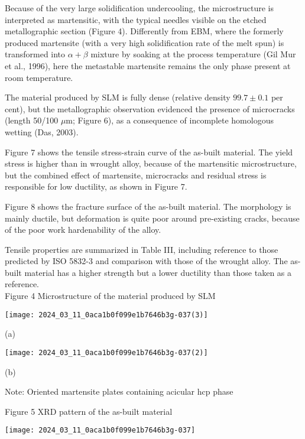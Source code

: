\documentclass[10pt]{article}
\begin{document}
Because of the very large solidification undercooling, the microstructure is interpreted as martensitic, with the typical needles visible on the etched metallographic section (Figure 4). Differently from EBM, where the formerly produced martensite (with a very high solidification rate of the melt spun) is transformed into $\alpha+\beta$ mixture by soaking at the process temperature (Gil Mur et al., 1996), here the metastable martensite remains the only phase present at room temperature.

The material produced by SLM is fully dense (relative density $99.7 \pm 0.1$ per cent), but the metallographic observation evidenced the presence of microcracks (length 50/100 $\mu \mathrm{m}$; Figure 6), as a consequence of incomplete homologous wetting (Das, 2003).

Figure 7 shows the tensile stress-strain curve of the as-built material. The yield stress is higher than in wrought alloy, because of the martensitic microstructure, but the combined effect of martensite, microcracks and residual stress is responsible for low ductility, as shown in Figure 7.

Figure 8 shows the fracture surface of the as-built material. The morphology is mainly ductile, but deformation is quite poor around pre-existing cracks, because of the poor work hardenability of the alloy.

Tensile properties are summarized in Table III, including reference to those predicted by ISO 5832-3 and comparison with those of the wrought alloy. The as-built material has a higher strength but a lower ductility than those taken as a reference.\\
Figure 4 Microstructure of the material produced by SLM

\begin{center}
\texttt{[image: 2024\_03\_11\_0aca1b0f099e1b7646b3g-037(3)]}
\end{center}

(a)

\begin{center}
\texttt{[image: 2024\_03\_11\_0aca1b0f099e1b7646b3g-037(2)]}
\end{center}

(b)

Note: Oriented martensite plates containing acicular hcp phase

Figure 5 XRD pattern of the as-built material

\begin{center}
\texttt{[image: 2024\_03\_11\_0aca1b0f099e1b7646b3g-037]}
\end{center}
\end{document}
